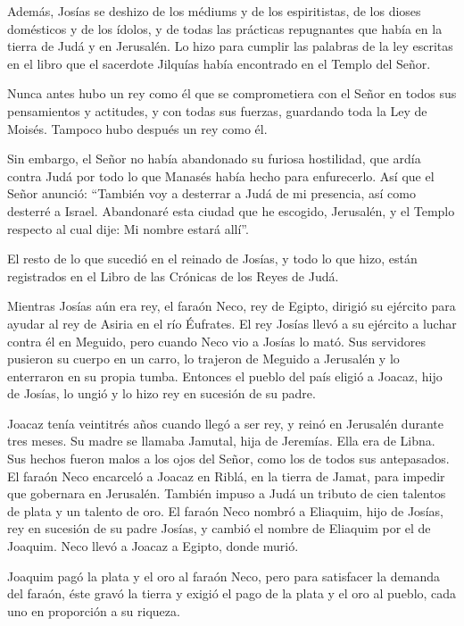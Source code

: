  Además, Josías se deshizo de los médiums y de los
espiritistas, de los dioses domésticos y de los ídolos, y de todas las
prácticas repugnantes que había en la tierra de Judá y en Jerusalén. Lo
hizo para cumplir las palabras de la ley escritas en el libro que el
sacerdote Jilquías había encontrado en el Templo del Señor.

 Nunca antes hubo un rey como él que se comprometiera con
el Señor en todos sus pensamientos y actitudes, y con todas sus fuerzas,
guardando toda la Ley de Moisés. Tampoco hubo después un rey como él.

 Sin embargo, el Señor no había abandonado su furiosa
hostilidad, que ardía contra Judá por todo lo que Manasés había hecho
para enfurecerlo.  Así que el Señor anunció: ``También voy
a desterrar a Judá de mi presencia, así como desterré a Israel.
Abandonaré esta ciudad que he escogido, Jerusalén, y el Templo respecto
al cual dije: Mi nombre estará allí''.

 El resto de lo que sucedió en el reinado de Josías, y todo
lo que hizo, están registrados en el Libro de las Crónicas de los Reyes
de Judá.

 Mientras Josías aún era rey, el faraón Neco, rey de
Egipto, dirigió su ejército para ayudar al rey de Asiria en el río
Éufrates. El rey Josías llevó a su ejército a luchar contra él en
Meguido, pero cuando Neco vio a Josías lo mató.  Sus
servidores pusieron su cuerpo en un carro, lo trajeron de Meguido a
Jerusalén y lo enterraron en su propia tumba. Entonces el pueblo del
país eligió a Joacaz, hijo de Josías, lo ungió y lo hizo rey en sucesión
de su padre.

 Joacaz tenía veintitrés años cuando llegó a ser rey, y
reinó en Jerusalén durante tres meses. Su madre se llamaba Jamutal, hija
de Jeremías. Ella era de Libna.  Sus hechos fueron malos a
los ojos del Señor, como los de todos sus antepasados.  El
faraón Neco encarceló a Joacaz en Riblá, en la tierra de Jamat, para
impedir que gobernara en Jerusalén. También impuso a Judá un tributo de
cien talentos de plata y un talento de oro.  El faraón Neco
nombró a Eliaquim, hijo de Josías, rey en sucesión de su padre Josías, y
cambió el nombre de Eliaquim por el de Joaquim. Neco llevó a Joacaz a
Egipto, donde murió.

 Joaquim pagó la plata y el oro al faraón Neco, pero para
satisfacer la demanda del faraón, éste gravó la tierra y exigió el pago
de la plata y el oro al pueblo, cada uno en proporción a su riqueza.

